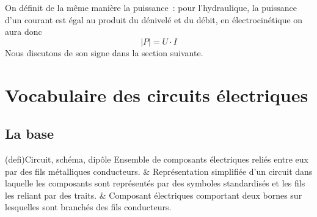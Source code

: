 \documentclass[../../main/main.tex]{subfiles}
\begin{document}
\smallbreak
On définit de la même manière la puissance~: pour l'hydraulique, la puissance
d'un courant est égal au produit du dénivelé et du débit, en
électrocinétique on aura donc
\[\boxed{\left| P \right| = U\cdot I}\]
Nous discutons de son signe dans la section suivante.

\section{Vocabulaire des circuits électriques}
\subsection{La base}
\begin{tcb*}[label=def:circuits, tabularx={Y|Y|Y}](defi){Circuit, schéma, dipôle}
	Ensemble de composants électriques reliés entre eux par des fils
	métalliques conducteurs. &
	Représentation simplifiée d'un circuit dans laquelle les composants sont
	représentés par des symboles standardisés et les fils les reliant par des
	traits. &
	Composant électriques comportant deux bornes sur lesquelles sont branchés
	des fils conducteurs.
\end{tcb*}
\end{document}
